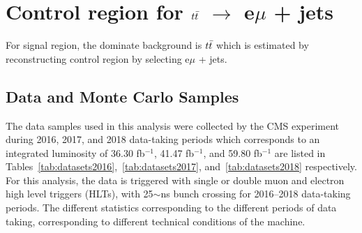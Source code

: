 \documentclass{cernatlasnote}
\begin{document}
\section{Control region for $t\Bar{t}$ $\rightarrow$ e$\mu$ + jets}
\label{APP: VALIDEMU}
For signal region, the dominate background is $t\Bar{t}$ which is estimated by reconstructing control region by selecting e$\mu$ + jets. 
\subsection{Data and Monte Carlo Samples}\label{sec:samples}
The data samples used in this analysis were collected by the CMS experiment during 2016, 2017, and 2018 data-taking periods which corresponds to an integrated luminosity of 36.30 fb$^{-1}$, 41.47 fb$^{-1}$, and 59.80 fb$^{-1}$ are listed in Tables~\ref{tab:datasets2016},~\ref{tab:datasets2017}, and~\ref{tab:datasets2018} respectively. For this analysis, the data is triggered with single or double muon and electron high level triggers (HLTs), with 25$\sim$ns bunch crossing for 2016--2018 data-taking periods. The different statistics corresponding to the different periods of data taking, corresponding to different technical conditions of the machine.

\end{document}
